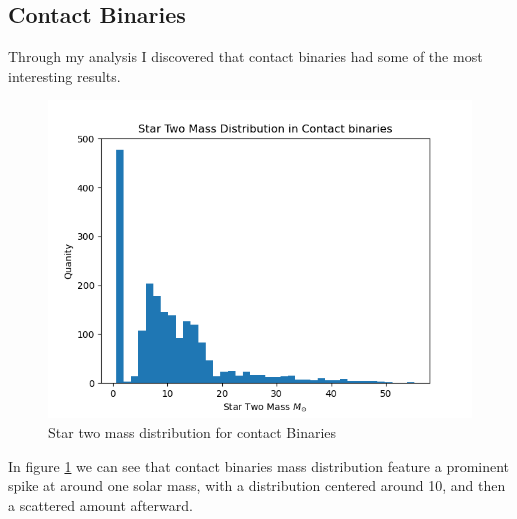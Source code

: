 \documentclass[12pt, a4paper]{article}
\begin{document}

        \subsection{\centering Contact Binaries}
            Through my analysis I discovered that contact binaries had some of the most interesting results. 
        \begin{figure}[H]
            \centering
            \includegraphics[scale = .6]{figs/GeneratedFigs/Contact binaries Star Two Mass Distribution.png}
            \caption{Star two mass distribution for contact Binaries}
            \label{contactBinaryStar2MassDistro}
        \end{figure}

        In figure \ref{contactBinaryStar2MassDistro} we can see that contact binaries mass distribution feature a prominent spike at around one solar mass, with a distribution centered around 10, and then a scattered amount afterward. 
\end{document}
